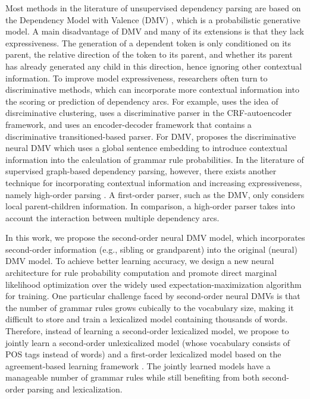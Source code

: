 \documentclass[11pt]{article}
\begin{document}
Most methods in the literature of unsupervised dependency parsing are based on the Dependency Model with Valence (DMV) \cite{Klein2004CorpusBasedIO}, which is a probabilistic generative model. A main disadvantage of DMV and many of its extensions is that they lack expressiveness. The generation of a dependent token is only conditioned on its parent, the relative direction of the token to its parent, and whether its parent has already generated any child in this direction, hence ignoring other contextual information. To improve model expressiveness, researchers often turn to discriminative methods, which can incorporate more contextual information into the scoring or prediction of dependency arcs. For example,  uses the idea of disrciminative clustering,   uses a discriminative parser in the CRF-autoencoder framework, and  uses an encoder-decoder framework that contains a discriminative transitioned-based parser. For DMV,  proposes the discriminative neural DMV which uses a global sentence embedding to introduce contextual information into the calculation of grammar rule probabilities. In the literature of supervised graph-based dependency parsing, however, there exists another technique for incorporating contextual information and increasing expressiveness, namely high-order parsing \cite{Koo2010EfficientTD,Ma2012FourthOrderDP}. A first-order parser, such as the DMV, only considers local parent-children information. In comparison, a high-order parser takes into account the interaction between multiple dependency arcs.

In this work, we propose the second-order neural DMV model, which incorporates second-order information (e.g., sibling or grandparent) into the original (neural) DMV model. To achieve better learning accuracy, we design a new neural architecture for rule probability computation and promote direct marginal likelihood optimization \cite{Salakhutdinov2003OptimizationWE,tran-etal-2016-unsupervised} over the widely used expectation-maximization algorithm for training. One particular challenge faced by second-order neural DMVs is that the number of grammar rules grows cubically to the vocabulary size, making it difficult to store and train a lexicalized model containing thousands of words. Therefore, instead of learning a second-order lexicalized model, we propose to jointly learn a second-order unlexicalized model (whose vocabulary consists of POS tags instead of words) and a first-order lexicalized model based on the agreement-based learning framework \cite{Liang2007AgreementBasedL}. The jointly learned models have a manageable number of grammar rules while still benefiting from both second-order parsing and lexicalization.
\end{document}

